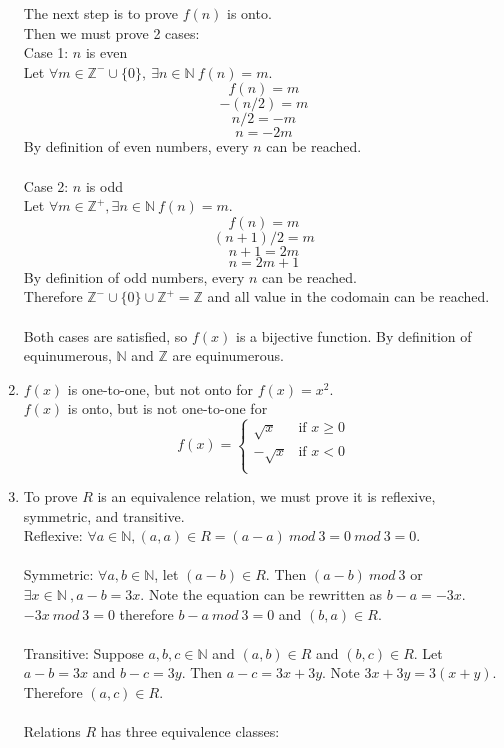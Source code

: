 \documentclass{article}
\newcommand{\Naturals}{\mathbb{N}}   %
\newcommand{\Integers}{\mathbb{Z}}   %
\begin{document}
\begin{enumerate}
		The next step is to prove $f(n)$ is onto.  \\
		Then we must prove 2 cases: \\
		Case 1: $n$ is even \\
		Let $\forall m \in \Integers^- \cup \{0\},\ \exists n \in \Naturals \ f(n) = m$.
		\[f(n) = m \]
		\[-(n/2) = m\]
		\[n/2 = -m \]
		\[n = -2m\]
		By definition of even numbers, every $n$ can be reached. \\
		\\
		Case 2: $n$ is odd \\
		Let $\forall m \in \Integers^+ , \exists n \in \Naturals \ f(n) = m$.
		\[f(n) = m\]
		\[(n+1)/2 = m\]
		\[n+1 = 2m\]
		\[n = 2m +1\]
		By definition of odd numbers, every $n$ can be reached. \\
		Therefore $\Integers^-\cup \{0\}\cup \Integers^+ = \Integers$ and all value in the codomain can be reached. \\
		\\
		Both cases are satisfied, so $f(x)$ is a bijective function. By definition of equinumerous, $\Naturals$ and $\Integers$ are equinumerous. 
	\item
		$f(x)$ is one-to-one, but not onto for $f(x)=x^2$.\\
		$f(x)$ is onto, but is not one-to-one for\\
		\[f(x)=
			\begin{cases}
			\sqrt{x} & \text{if $x\geq0$}\\
			-\sqrt{x} & \text{if $x<0$}\\
			\end{cases} 
		\]
	\item
		To prove $R$ is an equivalence relation, we must prove it is reflexive, symmetric, and transitive.\\
		Reflexive: $\forall a\in\Naturals, (a,a)\in R = (a-a)\ mod\ 3 = 0\ mod\ 3 = 0$.\\
		\\
		Symmetric: $\forall a, b\in\Naturals$, let $(a-b)\in R$. Then $(a-b)\ mod\ 3$ or $\exists x\in \Naturals\ , a-b=3x$. Note the equation can be rewritten as $b-a=-3x$. $-3x\ mod\ 3=0$ therefore $b-a\ mod\ 3=0$ and $(b,a)\in R$.\\
		\\
		Transitive: Suppose $a,b,c\in \Naturals$ and $(a,b)\in R$ and $(b,c)\in R$. Let $a-b=3x$ and $b-c=3y$. Then $a-c=3x+3y$. Note $3x+3y=3(x+y)$. Therefore $(a,c)\in R$.\\
		\\
		Relations $R$ has three equivalence classes:

\end{enumerate}
\end{document}
